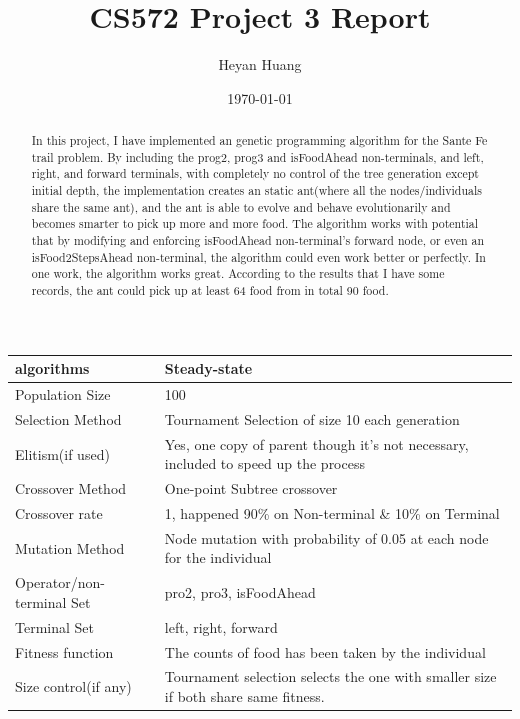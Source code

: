 \documentclass[10pt,b5paper]{article}
\author{Heyan Huang}
\date{\today}
\title{CS572 Project 3 Report}
\begin{document}
\maketitle
\tableofcontents

\begin{abstract}
In this project, I have implemented an genetic programming algorithm for the Sante Fe trail problem. By including the prog2, prog3 and isFoodAhead non-terminals, and left, right, and forward terminals, with completely no control of the tree generation except initial depth, the implementation creates an static ant(where all the nodes/individuals share the same ant), and the ant is able to evolve and behave evolutionarily and becomes smarter to pick up more and more food. The algorithm works with potential that by modifying and enforcing isFoodAhead non-terminal's forward node, or even an isFood2StepsAhead non-terminal, the algorithm could even work better or perfectly. In one work, the algorithm works great. According to the results that I have some records, the ant could pick up at least 64 food from in total 90 food. 
\end{abstract}

\begin{center}
\begin{tabular}{ll}
\hline
algorithms & Steady-state\\
\hline
Population Size & 100\\
Selection Method & Tournament Selection of size 10 each generation\\
Elitism(if used) & Yes, one copy of parent though it's not necessary, included to speed up the process\\
Crossover Method & One-point Subtree crossover\\
Crossover rate & 1, happened 90\% on Non-terminal \& 10\% on Terminal\\
Mutation Method & Node mutation with probability of 0.05 at each node for the individual\\
Operator/non-terminal Set & pro2, pro3, isFoodAhead\\
Terminal Set & left, right, forward\\
Fitness function & The counts of food has been taken by the individual\\
Size control(if any) & Tournament selection selects the one with smaller size if both share same fitness.\\
\hline
\end{tabular}
\end{center}
\end{document}

